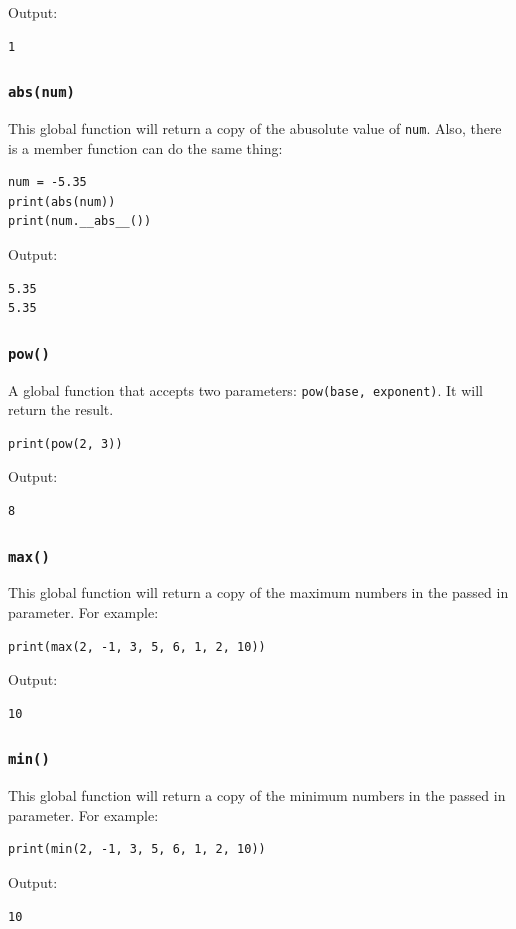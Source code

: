 \documentclass[12pt]{book}
\begin{document}
Output:
\begin{verbatim}
1
\end{verbatim}
\subsubsection{\texttt{abs(num)}}
\label{sec:orgd681cb7}
This global function will return a copy of the abusolute value of \texttt{num}. Also, there is a member function can do the same thing:
\begin{verbatim}
num = -5.35
print(abs(num))
print(num.__abs__())
\end{verbatim}
Output:
\begin{verbatim}
5.35
5.35
\end{verbatim}

\subsubsection{\texttt{pow()}}
\label{sec:org4e66802}
A global function that accepts two parameters: \texttt{pow(base, exponent)}. It will return the result.
\begin{verbatim}
print(pow(2, 3))
\end{verbatim}
Output:
\begin{verbatim}
8
\end{verbatim}

\subsubsection{\texttt{max()}}
\label{sec:orgcfc3743}
This global function will return a copy of the maximum numbers in the passed in parameter. For example:
\begin{verbatim}
print(max(2, -1, 3, 5, 6, 1, 2, 10))
\end{verbatim}
Output:
\begin{verbatim}
10
\end{verbatim}

\subsubsection{\texttt{min()}}
\label{sec:org461d740}
This global function will return a copy of the minimum numbers in the passed in parameter. For example:
\begin{verbatim}
print(min(2, -1, 3, 5, 6, 1, 2, 10))
\end{verbatim}
Output:
\begin{verbatim}
10
\end{verbatim}
\end{document}
